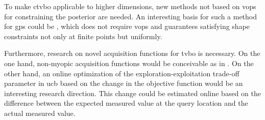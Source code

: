 To make \gls{ctvbo} applicable to higher dimensions, new methods not based on \glspl{vop} for constraining the posterior are needed. An interesting basis for such a method for \glspl{gp} could be \textcite{Aubin_2020}, which does not require \glspl{vop} and guarantees satisfying shape constraints not only at finite points but uniformly.

Furthermore, research on novel acquisition functions for \gls{tvbo} is necessary. On the one hand, non-myopic acquisition functions would be conceivable as in \textcite{Renganathan_2020}. On the other hand, an online optimization of the exploration-exploitation trade-off parameter in \gls{ucb} based on the change in the objective function would be an interesting research direction. This change could be estimated online based on the difference between the expected measured value at the query location and the actual measured value.

